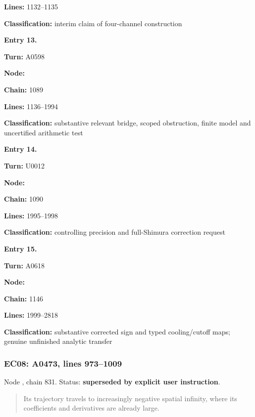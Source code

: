 \textbf{Lines:} 1132--1135

\textbf{Classification:} interim claim of four-channel construction


\textbf{Entry 13.}

\textbf{Turn:} A0598

\textbf{Node:} \protect{}

\textbf{Chain:} 1089

\textbf{Lines:} 1136--1994

\textbf{Classification:} substantive relevant bridge, scoped
obstruction, finite model and uncertified arithmetic test


\textbf{Entry 14.}

\textbf{Turn:} U0012

\textbf{Node:} \protect{}

\textbf{Chain:} 1090

\textbf{Lines:} 1995--1998

\textbf{Classification:} controlling precision and full-Shimura
correction request


\textbf{Entry 15.}

\textbf{Turn:} A0618

\textbf{Node:} \protect{}

\textbf{Chain:} 1146

\textbf{Lines:} 1999--2818

\textbf{Classification:} substantive corrected sign and typed
cooling/cutoff maps; genuine unfinished analytic transfer

\subsubsection{EC08: A0473, lines
973--1009}\label{TranscriptLedgerStage:ec08-a0473-lines-9731009}

Node \protect{}, chain 831.
Status: \textbf{superseded by explicit user instruction}.

\begin{quote}
Its trajectory travels to increasingly negative spatial infinity, where
its coefficients and derivatives are already large.
\end{quote}

